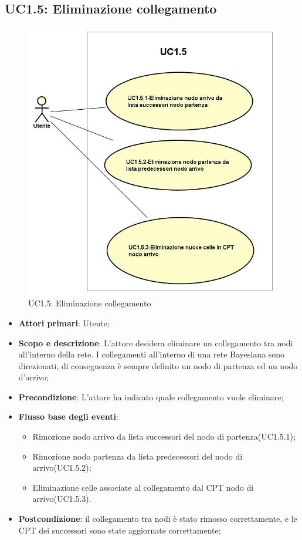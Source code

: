 \subsection{UC1.5: Eliminazione collegamento} 
\hypertarget{UC1.5}{} 
\begin{figure} [H]
	\centering
	\includegraphics[scale=0.45]{Img/UC1-5} 
	\caption{UC1.5: Eliminazione collegamento} \label{} 
\end{figure} 
\begin{itemize} 
	\item{\textbf{Attori primari}: Utente;} 
	\item{\textbf{Scopo e descrizione}: L'attore desidera eliminare un collegamento tra nodi all'interno della rete. I collegamenti all'interno di una rete Bayesiana sono direzionati, di conseguenza è sempre definito un nodo di partenza ed un nodo d'arrivo;} 
	\item{\textbf{Precondizione}: L'attore ha indicato quale collegamento vuole eliminare;} 
	\item{\textbf{Flusso base degli eventi}: } 
	\begin{itemize} 
		\item{Rimozione nodo arrivo da lista successori del nodo di partenza(UC1.5.1);} 
		\item{Rimozione nodo partenza da lista predecessori del nodo di arrivo(UC1.5.2);} 
		\item{Eliminazione celle associate al collegamento dal CPT nodo di arrivo(UC1.5.3).} 
	\end{itemize} 
	\item{\textbf{Postcondizione}: il collegamento tra nodi è stato rimosso correttamente, e le CPT dei successori sono state aggiornate correttamente;} 
\end{itemize} 
